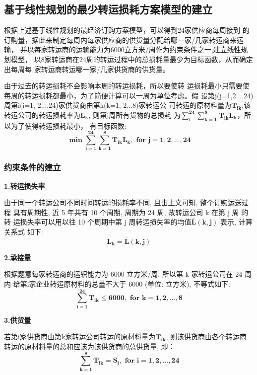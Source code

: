 \documentclass[UTF8]{ctexart}
\begin{document}
\subsection{基于线性规划的最少转运损耗方案模型的建立}
根据上述基于线性规划的最经济订购方案模型，可以得到24家供应商每周接到
的订购量，据此来制定每周内每家供应商的供货量分配给哪一家/几家转运商来运输，
并以每家转运商的运输能力为6000立方米/周作为约束条件之一,建立线性规划模型，
以8家转运商在24周的转运过程中的总损耗量最少为目标函数，从而确定出每周每
家转运商转运哪一家/几家供货商的供货量。

由于过去的转运损耗不会影响本周的转运损耗，所以要使转
运损耗最小只需要使每周的转运损耗都最小，为了简便计算可以一周为单位考虑。假
设第j(j=1,2....24)周第i(i=1, 2....24)家供货商由第k(k=1, 2...8)家转运公
司转运的原材料量为$\mathbf{T_{ik}}$,该转运公司的转运损耗率为$\mathbf{L_{k}}$,
则第j周所有货物的总损耗
为$\mathbf{\sum_{i}^{24}\sum_{k=1}^{8}T_{ik}L_{k}}$，所以为了使得转运损耗最小，
有目标函数:
\begin{equation}
	\mathbf{\min \sum_{i=1}^{24} \sum_{k=1}^{8} T_{i k} L_{k}, \text { for } j=1,2, \ldots, 24}
\end{equation}\par
\subsubsection{约束条件的建立}
\textbf{1.转运损失率}

由于同一个转运公司不同时间转运的损耗率不同, 且由上文可知, 整个订购运送过程
具有周期性, 近 5 年共有 10 个周期, 周期为 24 周, 故转运公司  k  在第  j  周
的转 运损失率可以用以往 10 个周期中第  j  周转运损失率的均值$\mathbf{\bar{L}(k, j)}$  
表示, 计算关系式 如下:
\begin{equation}
	\mathbf{L_{k}=\bar{L}(k, j)}
\end{equation}

\textbf{2.承接量}

根据题意每家转运商的运轵能力为 6000 立方米/周, 所以第  k  家转运公司在 24 周内
给第i家企业转运原材料的总量不大于 6000 (单位: 立方米), 不等式如下:
\begin{equation}
	\mathbf{\sum_{i=1}^{24} T_{i k} \leqslant 6000, \text { for } k=1,2, \ldots, 8}
\end{equation}

\textbf{3.供货量}

若第i家供货商由第k家转运公司转运的原材科量为$\mathbf{T_{ik}}$, 则该供货商由各个转运商
转运的原材料量的总和应该为该供货商的总供货量, 即：
\begin{equation}
	\mathbf{\sum_{k=1}^{8} T_{i k}=S_{i}, \text { for } i=1,2, \ldots, 24}
\end{equation}
\end{document}
